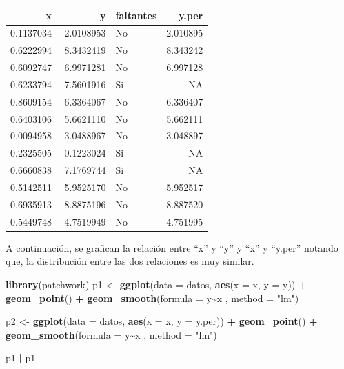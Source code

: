 \documentclass[
  12pt,
]{book}
\newenvironment{Shaded}{\begin{snugshade}}{\end{snugshade}}
\newcommand{\AttributeTok}[1]{\textcolor[rgb]{0.13,0.29,0.53}{#1}}
\newcommand{\FunctionTok}[1]{\textcolor[rgb]{0.13,0.29,0.53}{\textbf{#1}}}
\newcommand{\NormalTok}[1]{#1}
\newcommand{\OtherTok}[1]{\textcolor[rgb]{0.56,0.35,0.01}{#1}}
\newcommand{\SpecialCharTok}[1]{\textcolor[rgb]{0.81,0.36,0.00}{\textbf{#1}}}
\newcommand{\StringTok}[1]{\textcolor[rgb]{0.31,0.60,0.02}{#1}}
\begin{document}
\begin{tabular}{r|r|l|r}
\hline
x & y & faltantes & y.per\\
\hline
0.1137034 & 2.0108953 & No & 2.010895\\
\hline
0.6222994 & 8.3432419 & No & 8.343242\\
\hline
0.6092747 & 6.9971281 & No & 6.997128\\
\hline
0.6233794 & 7.5601916 & Si & NA\\
\hline
0.8609154 & 6.3364067 & No & 6.336407\\
\hline
0.6403106 & 5.6621110 & No & 5.662111\\
\hline
0.0094958 & 3.0488967 & No & 3.048897\\
\hline
0.2325505 & -0.1223024 & Si & NA\\
\hline
0.6660838 & 7.1769744 & Si & NA\\
\hline
0.5142511 & 5.9525170 & No & 5.952517\\
\hline
0.6935913 & 8.8875196 & No & 8.887520\\
\hline
0.5449748 & 4.7519949 & No & 4.751995\\
\hline
\end{tabular}

A continuación, se grafican la relación entre ``x'' y ``y'' y ``x'' y ``y.per'' notando que, la distribución entre las dos relaciones es muy similar.

\begin{Shaded}
\begin{Highlighting}[]
\FunctionTok{library}\NormalTok{(patchwork)}
\NormalTok{p1 }\OtherTok{\textless{}{-}} \FunctionTok{ggplot}\NormalTok{(}\AttributeTok{data =}\NormalTok{ datos, }\FunctionTok{aes}\NormalTok{(}\AttributeTok{x =}\NormalTok{ x, }\AttributeTok{y =}\NormalTok{ y)) }\SpecialCharTok{+}
  \FunctionTok{geom\_point}\NormalTok{() }\SpecialCharTok{+} \FunctionTok{geom\_smooth}\NormalTok{(}\AttributeTok{formula =}\NormalTok{ y}\SpecialCharTok{\textasciitilde{}}\NormalTok{x , }\AttributeTok{method =} \StringTok{"lm"}\NormalTok{)}

\NormalTok{p2 }\OtherTok{\textless{}{-}} \FunctionTok{ggplot}\NormalTok{(}\AttributeTok{data =}\NormalTok{ datos, }\FunctionTok{aes}\NormalTok{(}\AttributeTok{x =}\NormalTok{ x, }\AttributeTok{y =}\NormalTok{ y.per)) }\SpecialCharTok{+}
  \FunctionTok{geom\_point}\NormalTok{() }\SpecialCharTok{+} \FunctionTok{geom\_smooth}\NormalTok{(}\AttributeTok{formula =}\NormalTok{ y}\SpecialCharTok{\textasciitilde{}}\NormalTok{x , }\AttributeTok{method =} \StringTok{"lm"}\NormalTok{)}
  
\NormalTok{p1 }\SpecialCharTok{|}\NormalTok{ p1}
\end{Highlighting}
\end{Shaded}
\end{document}
